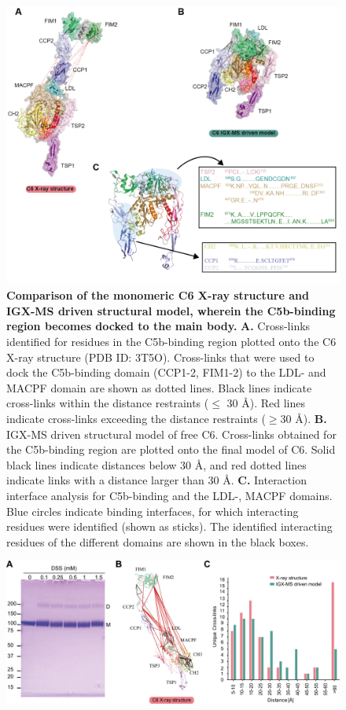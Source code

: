 \begin{subappendices}
\begin{figure}[hbt]
    \end{figure}
    \begin{figure}[hbt]
        \center
        \includegraphics[]{Chapter.2/Figures/SI_Figure6.png}
        \caption{\textbf{Comparison of the monomeric C6 X-ray structure and IGX-MS driven structural model, wherein the C5b-binding region becomes docked to the main body.} \textbf{A.} Cross-links identified for residues in the C5b-binding region plotted onto the C6 X-ray structure (PDB ID: 3T5O). Cross-links that were used to dock the C5b-binding domain (CCP1-2, FIM1-2) to the LDL- and MACPF domain are shown as dotted lines. Black lines indicate cross-links within the distance restraints ($\leq$ 30 Å). Red lines indicate cross-links exceeding the distance restraints ($\geq$30 Å). \textbf{B.} IGX-MS driven structural model of free C6. Cross-links obtained for the C5b-binding region are plotted onto the final model of C6. Solid black lines indicate distances below 30 Å, and red dotted lines indicate links with a distance larger than 30 Å. \textbf{C.} Interaction interface analysis for C5b-binding and the LDL-, MACPF domains. Blue circles indicate binding interfaces, for which interacting residues were identified (shown as sticks). The identified interacting residues of the different domains are shown in the black boxes.}
        \label{fig:ch2_app_fig8}
    \end{figure}
    \begin{figure}[hbt]
        \center
        \includegraphics[]{Chapter.2/Figures/EV_Figure3.png}

\end{figure}
\end{subappendices}
